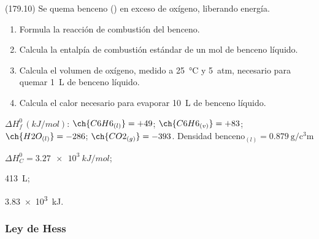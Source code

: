   \begin{exercise}[
      tags    = {},
      topics  = {química, termodinámica, termoquímica},
      source  = {FQ 1B MGH 2016, p179, e10},
    ]
    (179.10) Se quema benceno () en exceso de oxígeno, liberando energía.

    \begin{enumerate}
      \item Formula la reacción de combustión del benceno.
      \item Calcula la entalpía de combustión estándar de un mol de
      benceno líquido.
      \item Calcula el volumen de oxígeno, medido a \SI{25}{\celsius} y \SI{5}{atm}, necesario para quemar \SI{1}{\liter} de benceno líquido.
      \item Calcula el calor necesario para evaporar \SI{10}{\liter} de benceno líquido.
    \end{enumerate}

    \begin{gexdatos}
      \( \Delta H^0_f\,(\si{kJ/mol}) \):
      \( \ch{C6H6_{(l)}}  = +49 \);
      \( \ch{C6H6_{(v)}}  = +83 \);
      \( \ch{H2O_{(l)}}   = -286 \);
      \( \ch{CO2_{(g)}}   = -393 \).
      Densidad \( \textrm{benceno}_{(l)} = \SI{0.879}{\gram\per\cubic\centi\meter} \)
    \end{gexdatos}
  \end{exercise}

  \begin{solution}
    \begin{enumerate*}
      \item \( \Delta H^0_C = \SI{3.27e3}{kJ/mol} \); \item \SI{413}{\liter}; \item \SI{3.83e3}{kJ}.
    \end{enumerate*}
  \end{solution}





  \subsubsection*{Ley de Hess}

